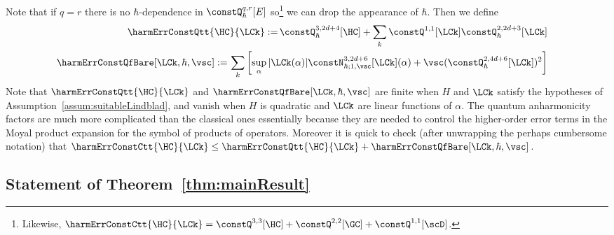 \documentclass{article}
\numberwithin{equation}{section}
\begin{document}
Note that if $q=r$ there is no $\hbar$-dependence
in $\constQ^{q,r}_{\hbar}[E]$ so\footnote{Likewise, $\harmErrConstCtt{\HC}{\LCk} = \constQ^{3,3}[\HC]+\constQ^{2,2}[\GC]+\constQ^{1,1}[\scD]$.} we can drop the appearance
of $\hbar$.  
Then we define
\begin{align}
    \begin{split}\label{eq:harmErrConstQtt-def}
    \harmErrConstQtt{\HC}{\LCk} :=\, &
        \constQ^{3,2d+4}_{\hbar}[\HC]
         + \sum_k
         \constQ^{1,1}[\LCk]
         \constQ^{2,2d+3}_{\hbar}[\LCk]
    \end{split}
    \\
    \begin{split}\label{eq:harmErrConstQf-def}
    \harmErrConstQfBare[\LCk,\hbar,\vsc] :=\, &
    \sum_k
        \left[
        \sup_{\alpha} |\LCk(\alpha)| \constN_{\hbar;1,\vsc}^{3,2d+6}[\LCk](\alpha)
        +
         \vsc (\constQ^{2,4d+6}_{\hbar}[\LCk])^2 
        \right]
    \end{split}
\end{align}
Note that $\harmErrConstQtt{\HC}{\LCk}$ and 
$\harmErrConstQfBare[\LCk,\hbar,\vsc]$ are finite when 
$H$ and $\LCk$ satisfy the hypotheses of Assumption~\ref{assum:suitableLindblad}, and vanish when $H$ is quadratic and $\LCk$ are linear functions of $\alpha$.
The quantum anharmonicity factors are much more complicated than the classical ones essentially because they are needed to control the higher-order error terms in the Moyal product expansion for the symbol of products of operators.  Moreover it is quick to check 
(after unwrapping the perhaps cumbersome notation) 
that $\harmErrConstCtt{\HC}{\LCk} \leq \harmErrConstQtt{\HC}{\LCk} + \harmErrConstQfBare[\LCk,\hbar,\vsc]$.    




\subsection{Statement of Theorem~\ref{thm:mainResult}}\label{sec:main-result-statement}
\end{document}
